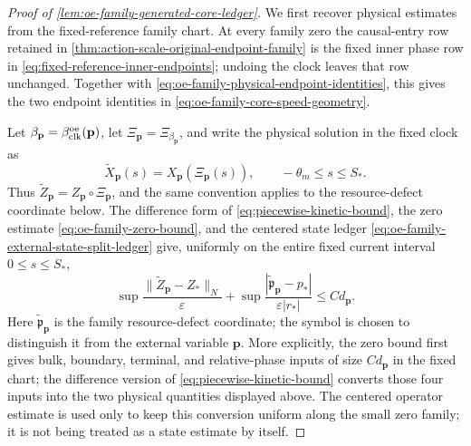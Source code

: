 \begin{proof}[Proof of
\cref{lem:oe-family-generated-core-ledger}]
We first recover physical estimates from the fixed-reference family chart.
At every family zero the causal-entry row retained in
\cref{thm:action-scale-original-endpoint-family} is the fixed inner phase
row in \cref{eq:fixed-reference-inner-endpoints}; undoing the clock leaves
that row unchanged.  Together with
\cref{eq:oe-family-physical-endpoint-identities}, this gives the two
endpoint identities in
\cref{eq:oe-family-core-speed-geometry}.

Let \(\beta_{\mathbf p}=\beta_{\rm clk}^{\rm oe}(\mathbf p)\), let
\(\Xi_{\mathbf p}=\Xi_{\beta_{\mathbf p}}\), and write the physical
solution in the fixed clock as
\[
 \widetilde X_{\mathbf p}(s)
 =X_{\mathbf p}(\Xi_{\mathbf p}(s)),
 \qquad -\theta_m\le s\le S_*.
\]
Thus \(\widetilde Z_{\mathbf p}=Z_{\mathbf p}\circ\Xi_{\mathbf p}\),
and the same convention applies to the resource-defect coordinate below.
The difference form of
\cref{eq:piecewise-kinetic-bound}, the zero estimate
\cref{eq:oe-family-zero-bound}, and the centered state ledger
\cref{eq:oe-family-external-state-split-ledger} give, uniformly on the
entire fixed current interval \(0\le s\le S_*\),
\begin{equation}
 \sup\frac{\|\widetilde Z_{\mathbf p}-Z_*\|_N}{\varepsilon}
 +\sup\frac{|\widetilde{\mathfrak p}_{\mathbf p}-p_*|}
                  {\varepsilon |r_*|}
 \le Cd_{\mathbf p}.                            \label{eq:proof-oe-family-core-pulled-difference}
\end{equation}
Here \(\widetilde{\mathfrak p}_{\mathbf p}\) is the family
resource-defect coordinate; the symbol is chosen to distinguish it from
the external variable \(\mathbf p\).  More explicitly, the zero bound
first gives bulk, boundary, terminal, and relative-phase inputs of size
\(Cd_{\mathbf p}\) in the fixed chart; the difference version of
\cref{eq:piecewise-kinetic-bound} converts those four inputs into the two
physical quantities displayed above.  The centered operator estimate is
used only to keep this conversion uniform along the small zero family; it
is not being treated as a state estimate by itself.


\end{proof}
